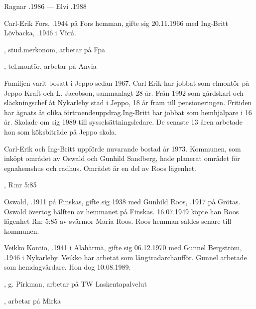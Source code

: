 Ragnar .1986  ---  Elvi .1988



%



%
Carl-Erik Fors, .1944 på Fors hemman, gifte sig 20.11.1966 med Ing-Britt Lövbacka, .1946 i Vörå.
\begin{jhchildren}
  \item {}, stud.merkonom, arbetar på Fpa
  \item {}, tel.montör, arbetar på Anvia
\end{jhchildren}

Familjen varit bosatt i Jeppo sedan 1967. Carl-Erik har jobbat som elmontör på Jeppo Kraft och L. Jacobson, sammanlagt 28 år. Från 1992 som gårdskarl och släckningschef åt Nykarleby stad i Jeppo, 18 år fram till pensioneringen. Fritiden har ägnats åt olika förtroendeuppdrag.Ing-Britt har jobbat som hemhjälpare i 16 år. Skolade om sig 1989 till sysselsättningsledare. De senaste 13 åren arbetade hon som köksbiträde på Jeppo skola.

Carl-Erik och Ing-Britt uppförde nuvarande bostad år 1973. Kommunen, som inköpt området av Oswald och Gunhild Sandberg, hade planerat området för egnahemshus och radhus. Området är en del av Roos lägenhet.


,  R:nr 5:85

%
Oswald, .1911 på Finskas, gifte sig 1938 med Gunhild Roos, .1917 på Grötas. Oswald övertog hälften av hemmanet på Finskas. 16.07.1949 köpte han Roos lägenhet Rn: 5:85 av svärmor Maria Roos. Roos hemman såldes senare till kommunen.



%



%
Veikko Kontio, .1941 i Alahärmä, gifte sig 06.12.1970 med Gunnel Bergström, .1946 i Nykarleby. Veikko har arbetat som långtradarchaufför. Gunnel arbetade som hemdagvårdare. Hon dog 10.08.1989.
\begin{jhchildren}
  \item {},  g. Pirkman, arbetar på TW Laskentapalvelut
  \item {}, arbetar på Mirka
\end{jhchildren}

